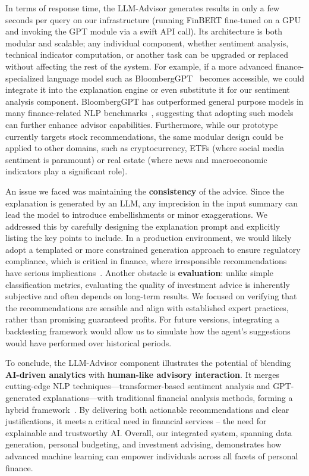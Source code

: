 \documentclass[conference]{IEEEtran}
\begin{document}
In terms of response time, the LLM-Advisor generates results in only a few seconds per query on our infrastructure (running FinBERT fine-tuned on a GPU and invoking the GPT module via a swift API call). Its architecture is both modular and scalable; any individual component, whether sentiment analysis, technical indicator computation, or another task can be upgraded or replaced without affecting the rest of the system. For example, if a more advanced finance-specialized language model such as BloombergGPT~\cite{b7} becomes accessible, we could integrate it into the explanation engine or even substitute it for our sentiment analysis component. BloombergGPT has outperformed general purpose models in many finance-related NLP benchmarks~\cite{b7}, suggesting that adopting such models can further enhance advisor capabilities. Furthermore, while our prototype currently targets stock recommendations, the same modular design could be applied to other domains, such as cryptocurrency, ETFs (where social media sentiment is paramount) or real estate (where news and macroeconomic indicators play a significant role).

An issue we faced was maintaining the \textbf{consistency} of the advice. Since the explanation is generated by an LLM, any imprecision in the input summary can lead the model to introduce embellishments or minor exaggerations. We addressed this by carefully designing the explanation prompt and explicitly listing the key points to include. In a production environment, we would likely adopt a templated or more constrained generation approach to ensure regulatory compliance, which is critical in finance, where irresponsible recommendations have serious implications~\cite{fieberg2023}. Another obstacle is \textbf{evaluation}: unlike simple classification metrics, evaluating the quality of investment advice is inherently subjective and often depends on long-term results. We focused on verifying that the recommendations are sensible and align with established expert practices, rather than promising guaranteed profits. For future versions, integrating a backtesting framework would allow us to simulate how the agent’s suggestions would have performed over historical periods.

To conclude, the LLM-Advisor component illustrates the potential of blending \textbf{AI-driven analytics} with \textbf{human-like advisory interaction}. It merges cutting-edge NLP techniques—transformer-based sentiment analysis and GPT-generated explanations—with traditional financial analysis methods, forming a hybrid framework~\cite{b7,bloomberggpt2023}. By delivering both actionable recommendations and clear justifications, it meets a critical need in financial services -- the need for explainable and trustworthy AI. Overall, our integrated system, spanning data generation, personal budgeting, and investment advising, demonstrates how advanced machine learning can empower individuals across all facets of personal finance.
\end{document}
